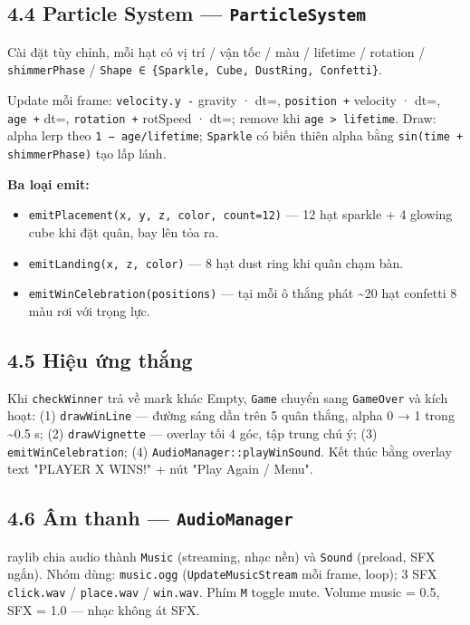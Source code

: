 \documentclass[11pt,a4paper]{article}
\begin{document}
\subsection{4.4 Particle System — \texttt{ParticleSystem}}
\label{sec:org54d6917}

Cài đặt tùy chỉnh, mỗi hạt có vị trí / vận tốc / màu / lifetime / rotation / \texttt{shimmerPhase} / \texttt{Shape ∈ \{Sparkle, Cube, DustRing, Confetti\}}.

Update mỗi frame: \texttt{velocity.y -} gravity · dt=, \texttt{position +} velocity · dt=, \texttt{age +} dt=, \texttt{rotation +} rotSpeed · dt=; remove khi \texttt{age > lifetime}. Draw: alpha lerp theo \texttt{1 − age/lifetime}; \texttt{Sparkle} có biến thiên alpha bằng \texttt{sin(time + shimmerPhase)} tạo lấp lánh.

\textbf{Ba loại emit:}

\begin{itemize}
\item \texttt{emitPlacement(x, y, z, color, count=12)} — 12 hạt sparkle + 4 glowing cube khi đặt quân, bay lên tỏa ra.
\item \texttt{emitLanding(x, z, color)} — 8 hạt dust ring khi quân chạm bàn.
\item \texttt{emitWinCelebration(positions)} — tại mỗi ô thắng phát \textasciitilde{}20 hạt confetti 8 màu rơi với trọng lực.
\end{itemize}
\subsection{4.5 Hiệu ứng thắng}
\label{sec:orgc58ae20}

Khi \texttt{checkWinner} trả về mark khác Empty, \texttt{Game} chuyển sang \texttt{GameOver} và kích hoạt: (1) \texttt{drawWinLine} — đường sáng dần trên 5 quân thắng, alpha 0 → 1 trong \textasciitilde{}0.5 s; (2) \texttt{drawVignette} — overlay tối 4 góc, tập trung chú ý; (3) \texttt{emitWinCelebration}; (4) \texttt{AudioManager::playWinSound}. Kết thúc bằng overlay text "PLAYER X WINS!" + nút "Play Again / Menu".
\subsection{4.6 Âm thanh — \texttt{AudioManager}}
\label{sec:org1e96c4b}

raylib chia audio thành \texttt{Music} (streaming, nhạc nền) và \texttt{Sound} (preload, SFX ngắn). Nhóm dùng: \texttt{music.ogg} (\texttt{UpdateMusicStream} mỗi frame, loop); 3 SFX \texttt{click.wav} / \texttt{place.wav} / \texttt{win.wav}. Phím \texttt{M} toggle mute. Volume music = 0.5, SFX = 1.0 — nhạc không át SFX.
\end{document}
